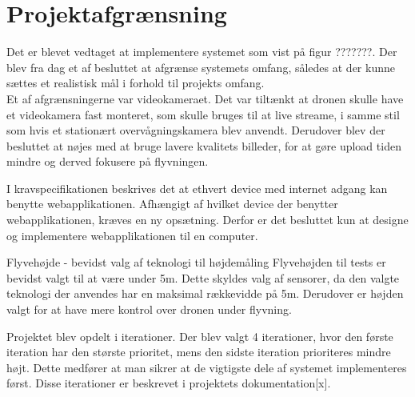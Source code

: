 \section{Projektafgrænsning}

Det er blevet vedtaget at implementere systemet som vist på figur ???????.
Der blev fra dag et af besluttet at afgrænse systemets omfang, således at der kunne sættes et realistisk mål i forhold til projekts omfang. \\
Et af afgrænsningerne var videokameraet. Det var tiltænkt at dronen skulle have et videokamera fast monteret, som skulle bruges til at live streame, i samme stil som hvis et stationært overvågningskamera blev anvendt.
Derudover blev der besluttet at nøjes med at bruge lavere kvalitets billeder, for  at gøre upload tiden mindre og derved fokusere på flyvningen.

I kravspecifikationen beskrives det at ethvert device med internet adgang kan benytte webapplikationen. Afhængigt af hvilket device der benytter webapplikationen, kræves en ny opsætning. Derfor er det besluttet kun at designe og implementere webapplikationen til en computer.

Flyvehøjde - bevidst valg af teknologi til højdemåling
Flyvehøjden til tests er bevidst valgt til at være under 5m. Dette skyldes valg af sensorer, da den valgte teknologi der anvendes har en maksimal rækkevidde på 5m. Derudover er højden valgt for at have mere kontrol over dronen under flyvning. 

Projektet blev opdelt i iterationer. Der blev valgt 4 iterationer, hvor den første iteration har den største prioritet, mens den sidste iteration prioriteres mindre højt. Dette medfører at man sikrer at de vigtigste dele af systemet implementeres først. Disse iterationer er beskrevet i projektets dokumentation[x].
